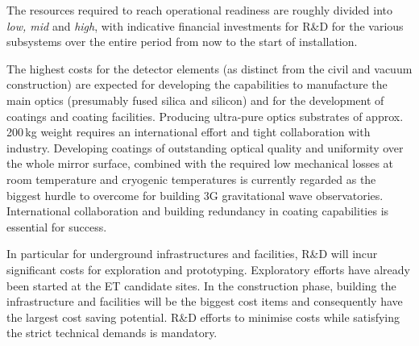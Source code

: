 The resources required to reach operational readiness are roughly divided into \textit{low, mid} and \textit{high}, with indicative financial investments for R\&D for the various subsystems over the entire period from now to the start of installation. 

The highest costs for the detector elements (as distinct from the civil and vacuum construction) are expected for developing the capabilities to manufacture the main optics (presumably fused silica and silicon) and for the development of coatings and coating facilities. 
Producing ultra-pure optics substrates of approx. 200\,kg weight requires an international effort and tight collaboration with industry. Developing coatings of outstanding optical quality and uniformity over the whole mirror surface, combined with the required low mechanical losses at  room temperature and cryogenic temperatures is currently regarded as the biggest hurdle to overcome for building 3G gravitational wave observatories. International collaboration and building redundancy in coating capabilities is essential for success.

In particular for underground infrastructures and facilities, R\&D will incur significant costs for exploration and prototyping. Exploratory efforts have already been started at the ET candidate sites. In the construction phase, building the infrastructure and facilities will be the biggest cost items and consequently have the largest cost saving potential. R\&D efforts to minimise costs while satisfying the strict technical demands is mandatory.



